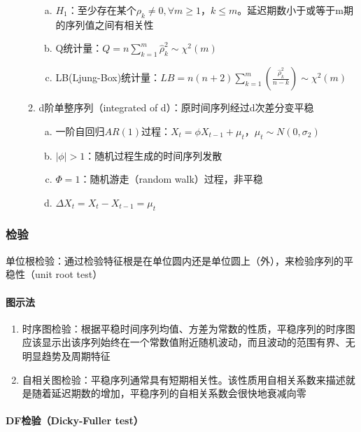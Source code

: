 \documentclass[12pt]{book}
\begin{document}
\begin{enumerate}[1.]
\begin{enumerate}[(1)]
\begin{enumerate}[a.]
        \item $H_1$：至少存在某个$\rho _k\neq 0,\forall m\geqslant 1，k\leqslant m$。延迟期数小于或等于m期的序列值之间有相关性  
        \item Q统计量：$Q=n\sum_{k=1}^{m}{\hat{\rho}}_k^2\sim \chi^2\left(m\right)$  
        \item LB(Ljung-Box)统计量：$LB=n(n+2)\sum_{k=1}^{m}{(\frac{{\hat{\rho}}_k^2}{n-k})}\sim\chi^2(m)$
    \end{enumerate}
    \item d阶单整序列（integrated of d）：原时间序列经过d次差分变平稳
    \begin{enumerate}[a.]
        \item 一阶自回归$AR(1)$过程：$X_t=\phi X_{t-1}+\mu_t，\mu_t\sim N(0,\sigma_2)$  
        \item $\left|\phi\right|>1$：随机过程生成的时间序列发散  
        \item $\Phi=1$：随机游走（random walk）过程，非平稳  
        \item $\Delta X_t=X_t-X_{t-1}=\mu_t$
    \end{enumerate}
\end{enumerate}
\end{enumerate}








\subsubsection{检验}
单位根检验：通过检验特征根是在单位圆内还是单位圆上（外），来检验序列的平稳性（unit root test）

\paragraph{图示法}

\begin{enumerate}[1.]
    \item 时序图检验：根据平稳时间序列均值、方差为常数的性质，平稳序列的时序图应该显示出该序列始终在一个常数值附近随机波动，而且波动的范围有界、无明显趋势及周期特征  
    \item 自相关图检验：平稳序列通常具有短期相关性。该性质用自相关系数来描述就是随着延迟期数的增加，平稳序列的自相关系数会很快地衰减向零
\end{enumerate}


\paragraph{DF检验（Dicky-Fuller test）}
\end{document}

